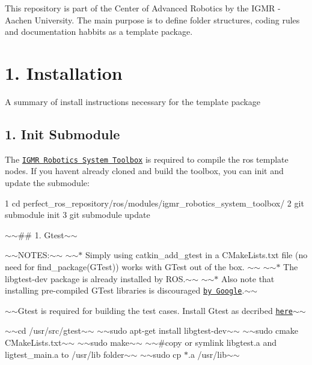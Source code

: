 

This repository is part of the Center of Advanced Robotics by the I\+G\+MR -\/ Aachen University. The main purpose is to define folder structures, coding rules and documentation habbits as a template package. 



\section*{1. Installation}

A summary of install instructions necessary for the template package

\subsection*{1. Init Submodule}

The \href{https://igm-git.igm.rwth-aachen.de/COAR/igmr_packages/igmr_robotics_system_toolbox}{\tt I\+G\+MR Robotics System Toolbox} is required to compile the ros template nodes. If you haven\textquotesingle{}t already cloned and build the toolbox, you can init and update the submodule\+: 
\begin{DoxyCode}
1 cd perfect\_ros\_repository/ros/modules/igmr\_robotics\_system\_toolbox/
2 git submodule init
3 git submodule update
\end{DoxyCode}
 



$\sim$$\sim$\#\# 1. Gtest$\sim$$\sim$

$\sim$$\sim$\+N\+O\+T\+ES\+:$\sim$$\sim$ $\sim$$\sim$$\ast$ Simply using {\ttfamily catkin\+\_\+add\+\_\+gtest} in a C\+Make\+Lists.\+txt file (no need for find\+\_\+package(\+G\+Test)) works with G\+Test out of the box. $\sim$$\sim$ $\sim$$\sim$$\ast$ The {\ttfamily libgtest-\/dev} package is already installed by R\+OS.$\sim$$\sim$ $\sim$$\sim$$\ast$ Also note that installing pre-\/compiled G\+Test libraries is discouraged \href{https://github.com/google/googletest/blob/master/googletest/docs/FAQ.md#why-is-it-not-recommended-to-install-a-pre-compiled-copy-of-google-test-for-example-into-usrlocal}{\tt by Google}.$\sim$$\sim$

$\sim$$\sim$\+Gtest is required for building the test cases. Install Gtest as decribed \href{http://ysonggit.github.io/coding/2014/12/19/use-gtest-in-ros-program.html}{\tt here}$\sim$$\sim$

$\sim$$\sim$cd /usr/src/gtest$\sim$$\sim$ $\sim$$\sim$sudo apt-\/get install libgtest-\/dev$\sim$$\sim$ $\sim$$\sim$sudo cmake C\+Make\+Lists.\+txt$\sim$$\sim$ $\sim$$\sim$sudo make$\sim$$\sim$ $\sim$$\sim$\#copy or symlink libgtest.\+a and ligtest\+\_\+main.\+a to /usr/lib folder$\sim$$\sim$ $\sim$$\sim$sudo cp $\ast$.a /usr/lib$\sim$$\sim$ 



